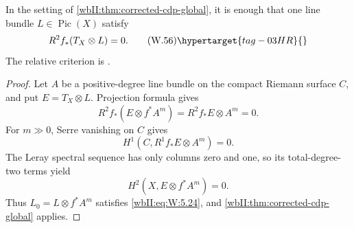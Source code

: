 \begin{corollary}\hypertarget{tag-03DT}{}\label{wbII:cor:corrected-cdp-relative}
\label{wbII:cor:relative}
In the setting of
\cref{wbII:thm:corrected-cdp-global}, it is enough that one line bundle
\(L\in\operatorname{Pic}(X)\) satisfy
\[
 R^2f_*(T_X\otimes L)=0.
\tag{W.56}\hypertarget{tag-03HR}{}\label{wbII:eq:W:5.29}
\]
The relative criterion is \cite[Proposition~2.4, p.~680]{CDP20}.
\end{corollary}



\begin{proof}
Let \(A\) be a positive-degree line bundle on the compact Riemann surface
\(C\), and put \(E=T_X\otimes L\).  Projection formula gives
\[
 R^2f_*(E\otimes f^*A^m)=R^2f_*E\otimes A^m=0.
\]
For \(m\gg0\), Serre vanishing on \(C\) gives
\[
 H^1(C,R^1f_*E\otimes A^m)=0.
\]
The Leray spectral sequence has only columns zero and one, so its
total-degree-two terms yield
\[
 H^2(X,E\otimes f^*A^m)=0.
\]
Thus \(L_0=L\otimes f^*A^m\) satisfies \eqref{wbII:eq:W:5.24}, and
\cref{wbII:thm:corrected-cdp-global} applies.

\end{proof}